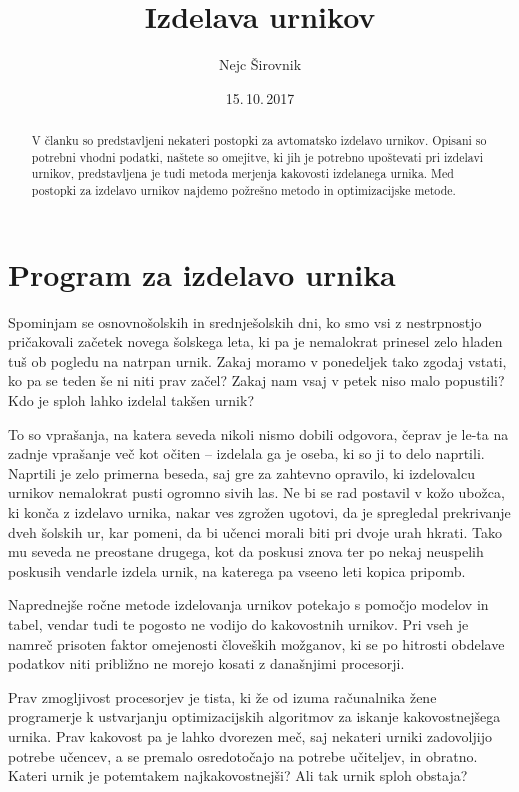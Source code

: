 \documentclass[a4paper,10pt]{article}
\begin{document}
\title{Izdelava urnikov}
\author{Nejc Širovnik}
\date{15.\,10.\,2017}
\maketitle



\begin{abstract}
   V članku so predstavljeni nekateri postopki za avtomatsko izdelavo urnikov. Opisani so
   potrebni vhodni podatki, naštete so omejitve, ki jih je potrebno upoštevati pri izdelavi
   urnikov, predstavljena je tudi metoda merjenja kakovosti izdelanega urnika. Med postopki 
   za izdelavo urnikov najdemo požrešno metodo in optimizacijske metode.
   
\end{abstract}
\section{Program za izdelavo urnika}
Spominjam se osnovnošolskih in srednješolskih dni, ko smo vsi z nestrpnostjo pričakovali
začetek novega šolskega leta, ki pa je nemalokrat prinesel zelo hladen tuš ob pogledu na
natrpan urnik. Zakaj moramo v ponedeljek tako zgodaj vstati, ko pa se teden še ni niti
prav začel? Zakaj nam vsaj v petek niso malo popustili? Kdo je sploh lahko izdelal
takšen urnik?

To so vprašanja, na katera seveda nikoli nismo dobili odgovora, čeprav je le-ta na zadnje
vprašanje več kot očiten -- izdelala ga je oseba, ki so ji to delo naprtili. Naprtili je
zelo primerna beseda, saj gre za zahtevno opravilo, ki izdelovalcu urnikov nemalokrat
pusti ogromno sivih las. Ne bi se rad postavil v kožo ubožca, ki konča z izdelavo urnika,
nakar ves zgrožen ugotovi, da je spregledal prekrivanje dveh šolskih ur, kar pomeni, da
bi učenci morali biti pri dvoje urah hkrati. Tako mu seveda ne preostane drugega, kot da
poskusi znova ter po nekaj neuspelih poskusih vendarle izdela urnik, na katerega pa vseeno
leti kopica pripomb.

Naprednejše ročne metode izdelovanja urnikov potekajo s pomočjo modelov in tabel, vendar
tudi te pogosto ne vodijo do kakovostnih urnikov. Pri vseh je namreč prisoten faktor
omejenosti človeških možganov, ki se po hitrosti obdelave podatkov niti približno ne
morejo kosati z današnjimi procesorji.

Prav zmogljivost procesorjev je tista, ki že od izuma računalnika žene programerje k
ustvarjanju optimizacijskih algoritmov za iskanje kakovostnejšega urnika. Prav kakovost
pa je lahko dvorezen meč, saj nekateri urniki zadovoljijo potrebe učencev, a se premalo
osredotočajo na potrebe učiteljev, in obratno. Kateri urnik je potemtakem najkakovostnejši?
Ali tak urnik sploh obstaja?
\end{document}
